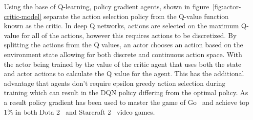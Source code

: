 Using the base of Q-learning, policy gradient agents, shown in figure~\ref{fig:actor-critic-model} separate the action
selection policy from the Q-value function known as the critic. In deep Q networks, actions are selected on the maximum
Q-value for all of the actions, however this requires actions to be discretized. By splitting the actions from the Q
values, an actor chooses an action based on the environment state allowing for both discrete and continuous action space.
With the actor being trained by the value of the critic agent that uses both the state and actor actions to calculate the
Q value for the agent. This has the additional advantage that agents don't require epsilon greedy action selection during
training which can result in the DQN policy differing from the optimal policy. As a result policy gradient has been
used to master the game of Go~\citep{silver2017mastering} and achieve top 1\% in both
Dota 2~\citep{OpenAI_dota} and Starcraft 2~\citep{starcraft2} video games.